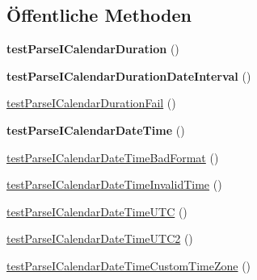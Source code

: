 \subsection*{Öffentliche Methoden}
\begin{DoxyCompactItemize}
\item 
\mbox{\label{class_sabre_1_1_v_object_1_1_date_time_parser_test_a4364db2c17ce6894b72726c7ce967b3a}} 
{\bfseries test\+Parse\+I\+Calendar\+Duration} ()
\item 
\mbox{\label{class_sabre_1_1_v_object_1_1_date_time_parser_test_ad18c03a355580c063705394aa2d470d5}} 
{\bfseries test\+Parse\+I\+Calendar\+Duration\+Date\+Interval} ()
\item 
\mbox{\hyperlink{class_sabre_1_1_v_object_1_1_date_time_parser_test_ab030721297311e2fc07daf3792de899a}{test\+Parse\+I\+Calendar\+Duration\+Fail}} ()
\item 
\mbox{\label{class_sabre_1_1_v_object_1_1_date_time_parser_test_aa865ecdc44ba97405d70f04cd893ef86}} 
{\bfseries test\+Parse\+I\+Calendar\+Date\+Time} ()
\item 
\mbox{\hyperlink{class_sabre_1_1_v_object_1_1_date_time_parser_test_a9b339aa97de1e57fc82ff9bac0a5bcb5}{test\+Parse\+I\+Calendar\+Date\+Time\+Bad\+Format}} ()
\item 
\mbox{\hyperlink{class_sabre_1_1_v_object_1_1_date_time_parser_test_ae1f974acacbead47be56f081b599a187}{test\+Parse\+I\+Calendar\+Date\+Time\+Invalid\+Time}} ()
\item 
\mbox{\hyperlink{class_sabre_1_1_v_object_1_1_date_time_parser_test_aa8b3b385c1ea6fa8a4f14c687e3f6b57}{test\+Parse\+I\+Calendar\+Date\+Time\+U\+TC}} ()
\item 
\mbox{\hyperlink{class_sabre_1_1_v_object_1_1_date_time_parser_test_aab32594ca0ba26c37cddcd34d96d4fd1}{test\+Parse\+I\+Calendar\+Date\+Time\+U\+T\+C2}} ()
\item 
\mbox{\hyperlink{class_sabre_1_1_v_object_1_1_date_time_parser_test_afc257adf61dd1117b0422321b632b20f}{test\+Parse\+I\+Calendar\+Date\+Time\+Custom\+Time\+Zone}} ()
\item 
\mbox{\label{class_sabre_1_1_v_object_1_1_date_time_parser_test_a8e5c8632751958d1950ee4737feb5486}} 

\end{DoxyCompactItemize}
